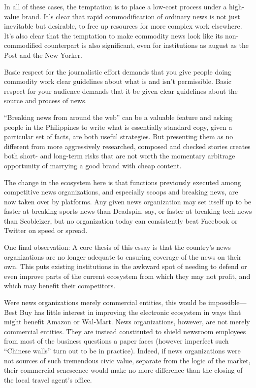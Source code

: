 In all of these cases, the temptation is to place a low-cost process under a
high-value brand. It’s clear that rapid commodification of ordinary news
is not just inevitable but desirable, to free up resources for more complex
work elsewhere. It’s also clear that the temptation to make commodity
news look like its non-commodified counterpart is also significant, even
for institutions as august as the Post and the New Yorker.

Basic respect for the journalistic effort demands that you give people
doing commodity work clear guidelines about what is and isn’t permissible.
Basic respect for your audience demands that it be given clear
guidelines about the source and process of news.

``Breaking news from around the web'' can be a valuable feature and
asking people in the Philippines to write what is essentially standard
copy, given a particular set of facts, are both useful strategies. But presenting
them as no different from more aggressively researched, composed
and checked stories creates both short- and long-term risks that
are not worth the momentary arbitrage opportunity of marrying a
good brand with cheap content.

The change in the ecosystem here is that functions previously executed among
competitive news organizations, and especially scoops and breaking news, are
now taken over by platforms. Any given news organization may set itself up to
be faster at breaking sports news than Deadspin, say, or faster at breaking tech
news than Scobleizer, but no organization today can consistently beat Facebook
or Twitter on speed or spread.

One final observation: A core thesis of this essay is that the country’s news organizations
are no longer adequate to ensuring coverage of the news on their own.
This puts existing institutions in the awkward spot of needing to defend or even
improve parts of the current ecosystem from which they may not profit, and
which may benefit their competitors.

Were news organizations merely commercial entities, this would be impossible—
Best Buy has little interest in improving the electronic ecosystem in ways
that might benefit Amazon or Wal-Mart. News organizations, however, are not
merely commercial entities. They are instead constituted to shield newsroom
employees from most of the business questions a paper faces (however imperfect
such ``Chinese walls'' turn out to be in practice). Indeed, if news organizations
were not sources of such tremendous civic value, separate from the logic of the
market, their commercial senescence would make no more difference than the
closing of the local travel agent’s office.

